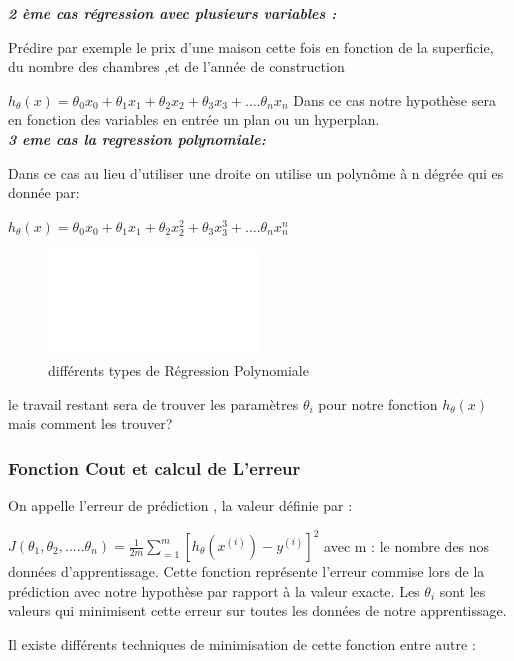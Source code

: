 \textbf{\emph{2 ème cas régression avec plusieurs variables :}}

 Prédire par exemple le prix d'une maison cette fois en fonction de la superficie, du nombre des chambres ,et de l'année de construction

${h}_{\theta}\left(x\right)={\theta }_{0}{x}_{0}+{\theta }_{1}{x}_{1}+{\theta }_{2}{x}_{2}+{\theta }_{3}{x}_{3}+....{\theta }_{n}{x}_{n}$
Dans ce cas notre hypothèse sera en fonction des variables en entrée un plan ou un hyperplan.\\

\textbf{\emph{3 eme cas la regression polynomiale:}}

Dans ce cas au lieu d'utiliser une droite on utilise un polynôme à n dégrée qui es donnée par:

${h}_{\theta}\left(x\right)={\theta }_{0}{x}_{0}+{\theta }_{1}{x}_{1}+{\theta }_{2}{x}_{2}^{2}+{\theta }_{3}{x}_{3}^{3}+....{\theta }_{n}{x}_{n}^{n}$
\begin{figure}[ht]
	\centering
	\includegraphics[width=0.5\textwidth]{fig/poly_regression.png}
	\caption{différents types de Régression Polynomiale }
	\label{fig:image2}
\end{figure}
le travail restant sera de trouver les paramètres ${\theta }_{i}$ pour notre fonction  ${h}_{\theta}\left(x\right)$ mais comment les trouver?

\subsubsection{Fonction Cout et calcul de L'erreur }
On appelle l'erreur de prédiction , la valeur définie par   :

 $J\left({\theta }_{1},{\theta }_{2},.....{\theta }_{n}\right)=\frac{1}{2m}\sum _{=1}^{m}{\left[{h}_{\theta}\left({x}^{(i)}\right) - {y}^{(i)}\right]}^2$
 avec m : le nombre des nos données d'apprentissage.
 Cette fonction représente l'erreur commise lors de la prédiction avec notre hypothèse par rapport à la valeur exacte.
 Les  ${\theta }_{i}$ sont les valeurs qui minimisent cette erreur sur toutes les données de notre apprentissage.
 
 Il existe différents techniques de minimisation de cette fonction entre autre :
 
